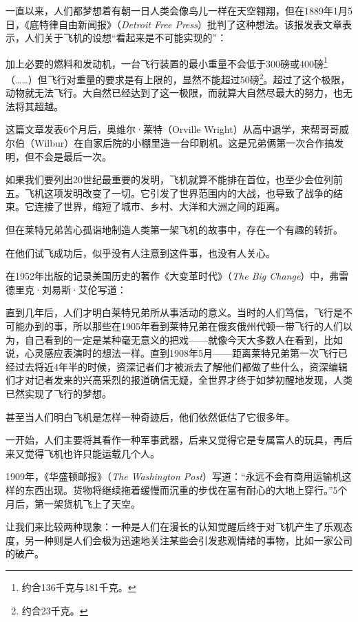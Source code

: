 一直以来，人们都梦想着有朝一日人类会像鸟儿一样在天空翱翔，但在1889年1月5日，《底特律自由新闻报》（\textit{Detroit Free Press}）批判了这种想法。该报发表文章表示，人们关于飞机的设想“看起来是不可能实现的”：

{\kaishu

加上必要的燃料和发动机，一台飞行装置的最小重量不会低于300磅或400磅\footnote{约合136千克与181千克。}（……）但飞行对重量的要求是有上限的，显然不能超过50磅\footnote{约合23千克。}。超过了这个极限，动物就无法飞行。大自然已经达到了这一极限，而就算大自然尽最大的努力，也无法将其超越。

}

这篇文章发表6个月后，奥维尔·莱特（Orville Wright）从高中退学，来帮哥哥威尔伯（Wilbur）在自家后院的小棚里造一台印刷机。这是兄弟俩第一次合作搞发明，但不会是最后一次。

如果我们要列出20世纪最重要的发明，飞机就算不能排在首位，也至少会位列前五。飞机这项发明改变了一切。它引发了世界范围内的大战，也导致了战争的结束。它连接了世界，缩短了城市、乡村、大洋和大洲之间的距离。

但在莱特兄弟苦心孤诣地制造人类第一架飞机的故事中，存在一个有趣的转折。

在他们试飞成功后，似乎没有人注意到这件事，也没有人关心。

在1952年出版的记录美国历史的著作《大变革时代》（\textit{The Big Change}）中，弗雷德里克·刘易斯·艾伦写道：

{\kaishu

直到几年后，人们才明白莱特兄弟所从事活动的意义。当时的人们笃信，飞行是不可能办到的事，所以那些在1905年看到莱特兄弟在俄亥俄州代顿一带飞行的人们以为，自己看到的一定是某种毫无意义的把戏——就像今天大多数人在看到，比如说，心灵感应表演时的想法一样。直到1908年5月——距离莱特兄弟第一次飞行已经过去将近4年半的时候，资深记者们才被派去了解他们都做了些什么，资深编辑们才对记者发来的兴高采烈的报道确信无疑，全世界才终于如梦初醒地发现，人类已然实现了飞行的梦想。

}

甚至当人们明白飞机是怎样一种奇迹后，他们依然低估了它很多年。

一开始，人们主要将其看作一种军事武器，后来又觉得它是专属富人的玩具，再后来又觉得飞机也许只能运载几个人。

1909年，《华盛顿邮报》（\textit{The Washington Post}）写道：“永远不会有商用运输机这样的东西出现。货物将继续拖着缓慢而沉重的步伐在富有耐心的大地上穿行。”5个月后，第一架货机飞上了天空。

让我们来比较两种现象：一种是人们在漫长的认知觉醒后终于对飞机产生了乐观态度，另一种则是人们会极为迅速地关注某些会引发悲观情绪的事物，比如一家公司的破产。

